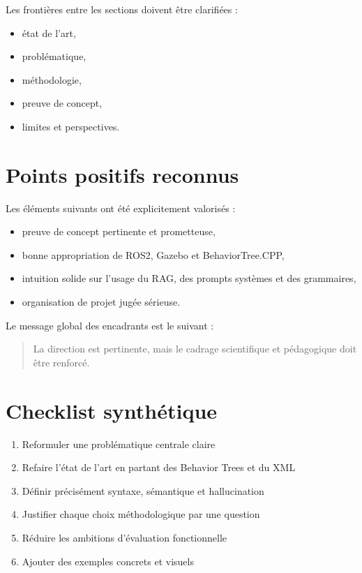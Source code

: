 \documentclass[11pt,a4paper]{article}
\begin{document}
Les frontières entre les sections doivent être clarifiées :
\begin{itemize}
    \item état de l’art,
    \item problématique,
    \item méthodologie,
    \item preuve de concept,
    \item limites et perspectives.
\end{itemize}

\section{Points positifs reconnus}

Les éléments suivants ont été explicitement valorisés :
\begin{itemize}
    \item preuve de concept pertinente et prometteuse,
    \item bonne appropriation de ROS2, Gazebo et BehaviorTree.CPP,
    \item intuition solide sur l’usage du RAG, des prompts systèmes et des grammaires,
    \item organisation de projet jugée sérieuse.
\end{itemize}

Le message global des encadrants est le suivant :
\begin{quote}
    La direction est pertinente, mais le cadrage scientifique et pédagogique doit être renforcé.
\end{quote}

\section{Checklist synthétique}

\begin{enumerate}
    \item Reformuler une problématique centrale claire
    \item Refaire l’état de l’art en partant des Behavior Trees et du XML
    \item Définir précisément syntaxe, sémantique et hallucination
    \item Justifier chaque choix méthodologique par une question
    \item Réduire les ambitions d’évaluation fonctionnelle
    \item Ajouter des exemples concrets et visuels
\end{enumerate}
\end{document}
